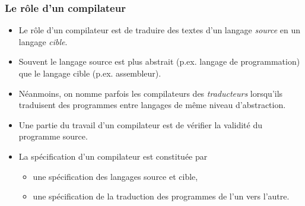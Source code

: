 %
\begin{frame}
\frametitle{Le rôle d'un compilateur}

\begin{itemize}

  \item Le rôle d'un compilateur est de traduire des textes
    d'un langage \emph{source} en un langage \emph{cible}.

  \item Souvent le langage source est plus abstrait
    (p.ex. langage de programmation) que le langage cible
    (p.ex. assembleur).

  \item Néanmoins, on nomme parfois les compilateurs des
    \emph{traducteurs} lorsqu'ils traduisent des programmes entre
    langages de même niveau d'abstraction.

  \item Une partie du travail d'un compilateur est de
    vérifier la validité du programme source.

  \item La spécification d'un compilateur est constituée par

    \begin{itemize}

      \item une spécification des langages source et cible,

      \item une spécification de la traduction des
        programmes de l'un vers l'autre.

    \end{itemize}

\end{itemize}

\end{frame}

